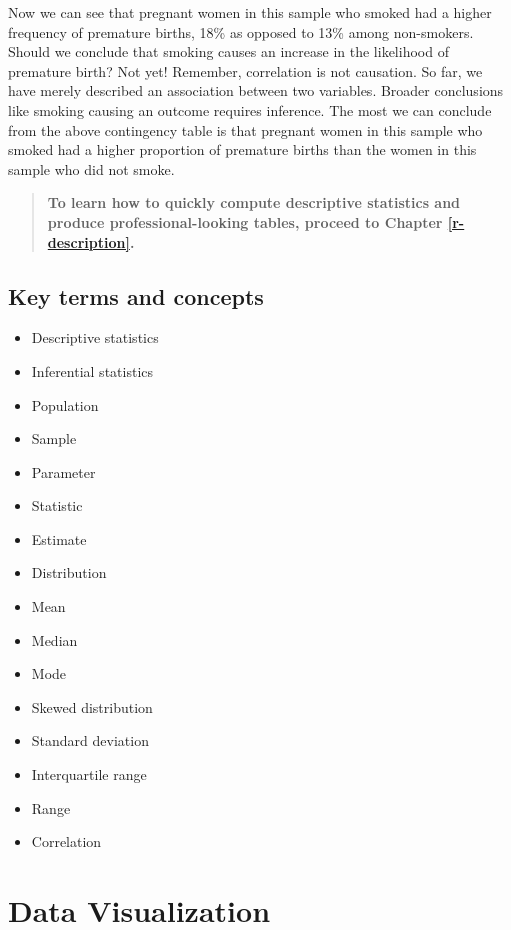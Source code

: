 \documentclass[
]{book}
\providecommand{\tightlist}{%
  \setlength{\itemsep}{0pt}\setlength{\parskip}{0pt}}
\begin{document}
Now we can see that pregnant women in this sample who smoked had a higher frequency of premature births, 18\% as opposed to 13\% among non-smokers. Should we conclude that smoking causes an increase in the likelihood of premature birth? Not yet! Remember, correlation is not causation. So far, we have merely described an association between two variables. Broader conclusions like smoking causing an outcome requires inference. The most we can conclude from the above contingency table is that pregnant women in this sample who smoked had a higher proportion of premature births than the women in this sample who did not smoke.

\begin{quote}
\textbf{To learn how to quickly compute descriptive statistics and produce professional-looking tables, proceed to Chapter \ref{r-description}.}
\end{quote}

\hypertarget{kt4}{%
\section{Key terms and concepts}\label{kt4}}

\begin{itemize}
\tightlist
\item
  Descriptive statistics
\item
  Inferential statistics
\item
  Population
\item
  Sample
\item
  Parameter
\item
  Statistic
\item
  Estimate
\item
  Distribution
\item
  Mean
\item
  Median
\item
  Mode
\item
  Skewed distribution
\item
  Standard deviation
\item
  Interquartile range
\item
  Range
\item
  Correlation
\end{itemize}

\hypertarget{data-visualization}{%
\chapter{Data Visualization}\label{data-visualization}}
\end{document}
